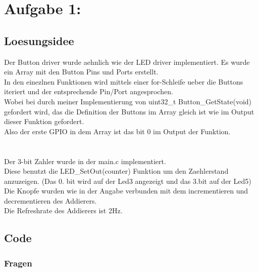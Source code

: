 \documentclass{report}
\newcommand{\name}{Marco Söllinger}
\newcommand{\matnr}{s2410306011}
\begin{document}


\section{Aufgabe 1:}

\subsection{Loesungsidee}
Der Button driver wurde aehnlich wie der LED driver implementiert. Es wurde ein Array mit den Button Pins und Ports erstellt.\\
In den einezlnen Funktionen wird mittels einer for-Schleife ueber die Buttons iteriert und der entsprechende Pin/Port angesprochen.\\
Wobei bei durch meiner Implementierung von uint32\_t Button\_GetState(void) gefordert wird, das die Definition der Buttons im Array gleich ist wie im Output dieser Funktion gefordert.\\
Also der erste GPIO in dem Array ist das bit 0 im Output der Funktion.\\\\\\
Der 3-bit Zahler wurde in der main.c implementiert.\\
Diese benutzt die LED\_SetOut(counter) Funktion um den Zaehlerstand anzuzeigen. (Das 0. bit wird auf der Led3 angezeigt und das 3.bit auf der Led5)\\
Die Knopfe wurden wie in der Angabe verbunden mit dem incrementieren und decrementieren des Addierers.\\
Die Refreshrate des Addierers ist 2Hz.\\

\subsection{Code}




\subsubsection{Fragen}
\end{document}
